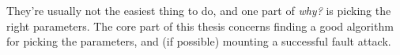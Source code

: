 \documentclass[times, utf8, diplomski]{fer}
\begin{document}
They're usually not the easiest thing to do, and one part of \emph{why?} is
picking the right parameters. The core part of this thesis concerns finding
a good algorithm for picking the parameters, and (if possible) mounting a
successful fault attack.


%
%
\end{document}
